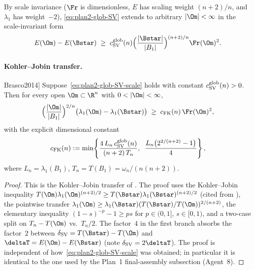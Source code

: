 By scale invariance ($\Fr$ is dimensionless, $E$ has scaling weight
$(n+2)/n$, and $\lambda_1$ has weight~$-2$),
\eqref{eq:plan2-glob-SV} extends to arbitrary $|\Om|<\infty$ in the
scale-invariant form
\begin{equation}\label{eq:plan2-glob-SV-scale}
   E(\Om)-E(\Bstar)\;\ge\;c_{\rm SV}^{\rm glob}(n)
   \Bigl(\frac{|\Bstar|}{|B_1|}\Bigr)^{(n+2)/n}\Fr(\Om)^{2}.
\end{equation}

\paragraph{Kohler--Jobin transfer.}

\begin{theorem}[Sharp Faber--Krahn from sharp Saint--Venant; cf.\
\cite[Thm.~3.3]{Brasco2014}]
\label{thm:plan2-KJ-import}
Suppose~\eqref{eq:plan2-glob-SV-scale} holds with constant
$c_{\rm SV}^{\rm glob}(n)>0$. Then for every open $\Om\subset\R^n$ with
$0<|\Om|<\infty$,
\begin{equation}\label{eq:plan2-FK-pre}
   \Bigl(\frac{|\Om|}{|B_1|}\Bigr)^{2/n}
   \bigl(\lambda_1(\Om)-\lambda_1(\Bstar)\bigr)
   \;\ge\;c_{\rm FK}(n)\,\Fr(\Om)^{2},
\end{equation}
with the explicit dimensional constant
\begin{equation}\label{eq:plan2-cFKdef}
   c_{\rm FK}(n)
   :=\min\!\left\{
       \frac{4\,L_n\,c_{\rm SV}^{\rm glob}(n)}{(n+2)\,T_n},\;\;
       \frac{L_n\bigl(2^{2/(n+2)}-1\bigr)}{4}
     \right\},
\end{equation}
where $L_n=\lambda_1(B_1)$, $T_n=T(B_1)=\omega_n/(n(n+2))$.
\end{theorem}

\begin{proof}
This is the Kohler--Jobin transfer of \cite[Theorem~3.3]{Brasco2014}.
The proof uses the Kohler--Jobin inequality
$T(\Om)\lambda_1(\Om)^{(n+2)/2}\ge T(\Bstar)\lambda_1(\Bstar)^{(n+2)/2}$
(cited from \cite[Theorem~3.3]{Brasco2014}), the pointwise transfer
$\lambda_1(\Om)\ge\lambda_1(\Bstar)(T(\Bstar)/T(\Om))^{2/(n+2)}$, the
elementary inequality $(1-s)^{-p}-1\ge ps$ for $p\in(0,1]$,
$s\in[0,1)$, and a two-case split on
$T_n-T(\Om)$ vs.\ $T_n/2$. The factor~$4$ in the first branch
absorbs the factor~$2$ between $\delta_{\rm SV}=T(\Bstar)-T(\Om)$ and
$\deltaT=E(\Om)-E(\Bstar)$ (note $\delta_{\rm SV}=2\deltaT$). The
proof is independent of how~\eqref{eq:plan2-glob-SV-scale} was
obtained; in particular it is identical to the one used by the
Plan~1 final-assembly subsection (Agent~8).
\end{proof}

